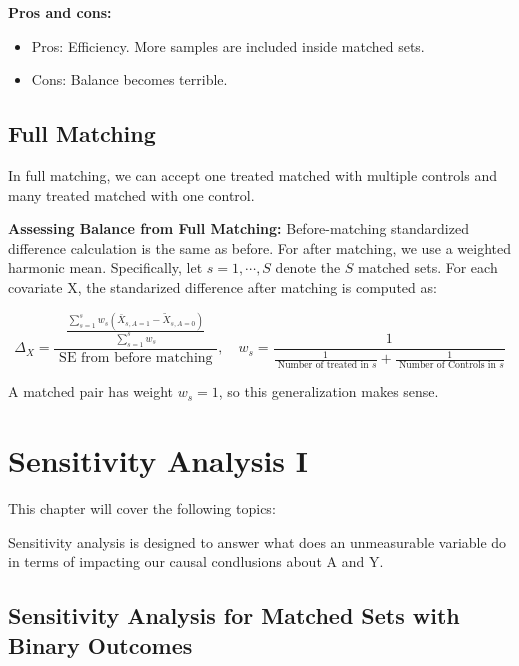 \documentclass[
]{book}
\providecommand{\tightlist}{%
  \setlength{\itemsep}{0pt}\setlength{\parskip}{0pt}}
\begin{document}
\textbf{Pros and cons:}

\begin{itemize}
\tightlist
\item
  Pros: Efficiency. More samples are included inside matched sets.
\item
  Cons: Balance becomes terrible.
\end{itemize}

\hypertarget{full-matching}{%
\section{Full Matching}\label{full-matching}}

In full matching, we can accept one treated matched with multiple controls and many treated matched with one control.

\textbf{Assessing Balance from Full Matching:} Before-matching standardized difference calculation is the same as before. For after matching, we use a weighted harmonic mean. Specifically, let \(s = 1, \cdots, S\) denote the \(S\) matched sets. For each covariate X, the standarized difference after matching is computed as:

\[\Delta_{X}=\frac{\frac{\sum_{s=1}^{s} w_{s}\left(\bar{X}_{s, A=1}-\tilde{X}_{s, A=0}\right)}{\sum_{s=1}^{s} w_{s}}}{\text { SE from before matching }}, \quad w_{s}=\frac{1}{\frac{1}{\text { Number of treated in } s}+\frac{1}{\text { Number of Controls in } s}}\]

A matched pair has weight \(w_s = 1\), so this generalization makes sense.

\hypertarget{sensitivity1}{%
\chapter{Sensitivity Analysis I}\label{sensitivity1}}

This chapter will cover the following topics:

Sensitivity analysis is designed to answer what does an unmeasurable variable do in terms of impacting our causal condlusions about A and Y.

\hypertarget{sensitivity-analysis-for-matched-sets-with-binary-outcomes}{%
\section{Sensitivity Analysis for Matched Sets with Binary Outcomes}\label{sensitivity-analysis-for-matched-sets-with-binary-outcomes}}
\end{document}
